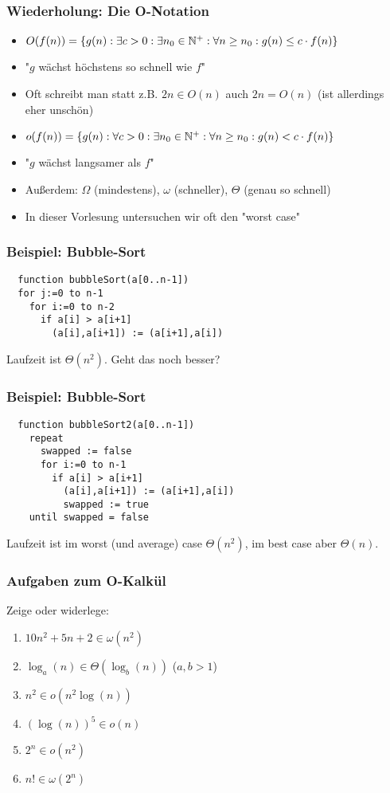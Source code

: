 \begin{frame}
\frametitle{Wiederholung: Die O-Notation}
\begin{itemize}
\item $O(f(n))=\{g(n):\exists c>0: \exists n_0\in\mathbb{N}^+: \forall n\geq n_0: g(n)\leq c\cdot f(n)\}$
\item "$g$ wächst höchstens so schnell wie $f$" \pause
\item Oft schreibt man statt z.B. $2n\in O(n)$ auch $2n=O(n)$ (ist allerdings eher unschön) \pause
\item $o(f(n))=\{g(n):\forall c>0: \exists n_0\in\mathbb{N}^+: \forall n\geq n_0: g(n)< c\cdot f(n)\}$
\item "$g$ wächst langsamer als $f$" \pause
\item Außerdem: $\Omega$ (mindestens), $\omega$ (schneller), $\Theta$ (genau so schnell) \pause
\item In dieser Vorlesung untersuchen wir oft den "worst case"
\end{itemize}
\end{frame}

\begin{frame}[fragile]
\frametitle{Beispiel: Bubble-Sort}
\begin{lstlisting}
  function bubbleSort(a[0..n-1])
  for j:=0 to n-1
    for i:=0 to n-2
      if a[i] > a[i+1]
        (a[i],a[i+1]) := (a[i+1],a[i]) 
\end{lstlisting}\pause
Laufzeit ist $\Theta(n^2)$. Geht das noch besser?
\end{frame}

\begin{frame}[fragile]
\frametitle{Beispiel: Bubble-Sort}
\begin{lstlisting}
  function bubbleSort2(a[0..n-1])
    repeat
      swapped := false
      for i:=0 to n-1
        if a[i] > a[i+1]
          (a[i],a[i+1]) := (a[i+1],a[i]) 
          swapped := true
    until swapped = false
\end{lstlisting}\pause
Laufzeit ist im worst (und average) case $\Theta(n^2)$, im best case aber $\Theta(n)$.
\end{frame}

\begin{frame}
\frametitle{Aufgaben zum O-Kalkül}
Zeige oder widerlege:
\begin{enumerate}
\item $10n^2 + 5n+2 \in \omega(n^2)$
\item $\log_a(n)\in\Theta(\log_b(n))$ ($a,b>1$)
\item $n^2 \in o(n^2 \log(n))$
\item $(\log(n))^5 \in o(n)$
\item $2^n \in o(n^2)$
\item $n! \in \omega(2^n)$
\end{enumerate}
\end{frame}

